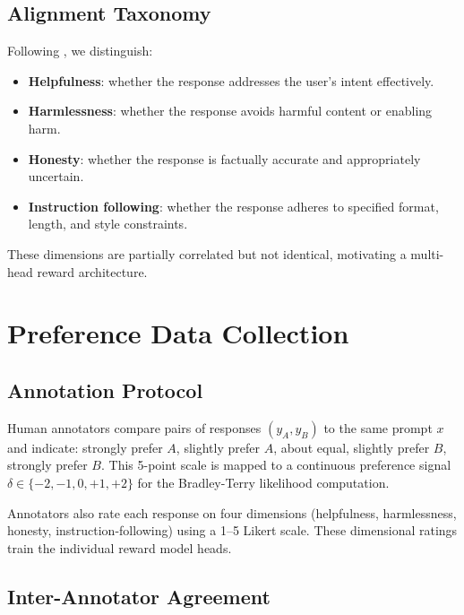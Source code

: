 \documentclass[11pt,a4paper]{article}
\begin{document}
\subsection{Alignment Taxonomy}

Following \cite{askell2021general}, we distinguish:
\begin{itemize}
    \item \textbf{Helpfulness}: whether the response addresses the user's intent effectively.
    \item \textbf{Harmlessness}: whether the response avoids harmful content or enabling harm.
    \item \textbf{Honesty}: whether the response is factually accurate and appropriately
          uncertain.
    \item \textbf{Instruction following}: whether the response adheres to specified format,
          length, and style constraints.
\end{itemize}

These dimensions are partially correlated but not identical, motivating a multi-head
reward architecture.

\section{Preference Data Collection}
\label{sec:data}

\subsection{Annotation Protocol}

Human annotators compare pairs of responses $(y_A, y_B)$ to the same prompt $x$ and
indicate: strongly prefer $A$, slightly prefer $A$, about equal, slightly prefer $B$,
strongly prefer $B$. This 5-point scale is mapped to a continuous preference signal
$\delta \in \{-2, -1, 0, +1, +2\}$ for the Bradley-Terry likelihood computation.

Annotators also rate each response on four dimensions (helpfulness, harmlessness,
honesty, instruction-following) using a 1--5 Likert scale. These dimensional ratings
train the individual reward model heads.

\subsection{Inter-Annotator Agreement}
\end{document}

